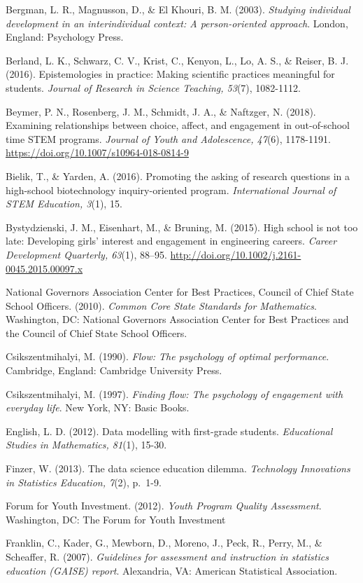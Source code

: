 \documentclass[]{msu-thesis}
\theoremstyle{definition}
\theoremstyle{definition}
\theoremstyle{definition}
\theoremstyle{remark}
\begin{document}
Bergman, L. R., Magnusson, D., \& El Khouri, B. M. (2003).
\emph{Studying individual development in an interindividual context: A
person-oriented approach}. London, England: Psychology Press.

Berland, L. K., Schwarz, C. V., Krist, C., Kenyon, L., Lo, A. S., \&
Reiser, B. J. (2016). Epistemologies in practice: Making scientific
practices meaningful for students. \emph{Journal of Research in Science
Teaching, 53}(7), 1082-1112.

Beymer, P. N., Rosenberg, J. M., Schmidt, J. A., \& Naftzger, N. (2018).
Examining relationships between choice, affect, and engagement in
out-of-school time STEM programs. \emph{Journal of Youth and
Adolescence, 47}(6), 1178-1191.
\url{https://doi.org/10.1007/s10964-018-0814-9}

Bielik, T., \& Yarden, A. (2016). Promoting the asking of research
questions in a high-school biotechnology inquiry-oriented program.
\emph{International Journal of STEM Education, 3}(1), 15.

Bystydzienski, J. M., Eisenhart, M., \& Bruning, M. (2015). High school
is not too late: Developing girls' interest and engagement in
engineering careers. \emph{Career Development Quarterly, 63}(1), 88--95.
\url{http://doi.org/10.1002/j.2161-0045.2015.00097.x}

National Governors Association Center for Best Practices, Council of
Chief State School Officers. (2010). \emph{Common Core State Standards
for Mathematics}. Washington, DC: National Governors Association Center
for Best Practices and the Council of Chief State School Officers.

Csikszentmihalyi, M. (1990). \emph{Flow: The psychology of optimal
performance}. Cambridge, England: Cambridge University Press.

Csikszentmihalyi, M. (1997). \emph{Finding flow: The psychology of
engagement with everyday life}. New York, NY: Basic Books.

English, L. D. (2012). Data modelling with first-grade students.
\emph{Educational Studies in Mathematics, 81}(1), 15-30.

Finzer, W. (2013). The data science education dilemma. \emph{Technology
Innovations in Statistics Education, 7}(2), p.~1-9.

Forum for Youth Investment. (2012). \emph{Youth Program Quality
Assessment}. Washington, DC: The Forum for Youth Investment

Franklin, C., Kader, G., Mewborn, D., Moreno, J., Peck, R., Perry, M.,
\& Scheaffer, R. (2007). \emph{Guidelines for assessment and instruction
in statistics education (GAISE) report}. Alexandria, VA: American
Statistical Association.
\end{document}

